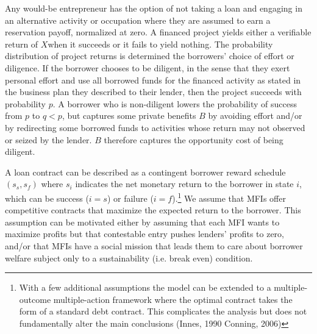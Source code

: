 \documentclass{article} %
\begin{document}
Any would-be entrepreneur has the option of not taking a loan and engaging in an alternative activity or occupation where they are assumed to earn a reservation payoff, normalized at zero.  A financed project yields either a verifiable return of $X$when it succeeds or it fails to yield nothing.  The probability distribution of project returns is determined the borrowers' choice of effort or diligence.   If the borrower chooses to be diligent, in the sense that they exert personal effort and use all borrowed funds for the financed activity as stated in the business plan they described to their lender, then the project succeeds with probability $p.$ A borrower who is non-diligent lowers the probability of success from $p$ to $q<p$, but captures some private benefits $B$ by avoiding effort and/or by redirecting some borrowed funds to activities whose return may not observed or seized by the lender. $B$ therefore captures the opportunity cost of being diligent. 

A loan contract can be described as a contingent borrower reward schedule $(s_{s} ,s_{f} )$ where $s_{i} $ indicates the net monetary return to the borrower in state $i$, which can be success ($i=s$) or failure ($i=f$).\footnote{With a few additional assumptions the model can be extended to a multiple-outcome multiple-action framework where the optimal contract takes the form of a standard debt contract.  This complicates the analysis but does not fundamentally alter the main conclusions (Innes, 1990\mathrm{;} Conning, 2006)}  We assume that MFIs offer competitive contracts that maximize the expected return to the borrower. This assumption can be motivated either by assuming that each MFI wants to maximize profits but that contestable entry pushes lenders' profits to zero, and/or that MFIs have a social mission that leads them to care about borrower welfare subject only to a sustainability (i.e. break even) condition.  
\end{document}
